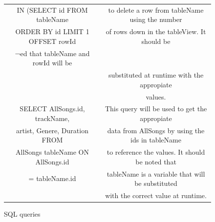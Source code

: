 \documentclass{article}
\begin{document}
\begin{figure}[H]
\begin{center}
\begin{tabular} { | c | c | }
            IN (SELECT id FROM tableName     &to delete a row from tableName using the number \\
            ORDER BY id LIMIT 1 OFFSET rowId &of rows down in the tableView. It should be     \\
                                             ¬ed that tableName and rowId will be          \\
                                             &substituted at runtime with the appropiate      \\
                                             &values.                                         \\ \hline
            SELECT AllSongs.id, trackName,   &This query will be used to get the appropiate   \\
            artist, Genere, Duration FROM    &data from AllSongs by using the ids in tableName\\
            AllSongs tableName ON AllSongs.id&to reference the values. It should be noted that\\
             = tableName.id                  &tableName is a variable that will be substituted\\
                                             &with the correct value at runtime.              \\ \hline
        \end{tabular}
    \end{center}
    \caption{SQL queries} \label{fig:SQLTable}
\end{figure}
\end{document}
